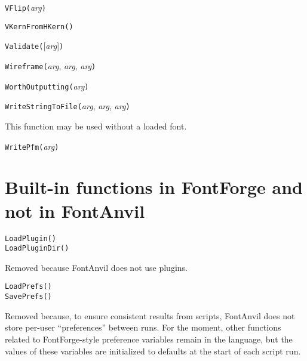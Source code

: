\texttt{VFlip(}\textit{arg}\texttt{)}



\texttt{VKernFromHKern(}\texttt{)}



\texttt{Validate(}[\textit{arg}]\texttt{)}



\texttt{Wireframe(}\textit{arg}, \textit{arg}, \textit{arg}\texttt{)}



\texttt{WorthOutputting(}\textit{arg}\texttt{)}



\texttt{WriteStringToFile(}\textit{arg}, \textit{arg}, \textit{arg}\texttt{)}

This function may be used without a loaded font.



\texttt{WritePfm(}\textit{arg}\texttt{)}


\section{Built-in functions in FontForge and not in FontAnvil}

\texttt{LoadPlugin()}\FFdiff\\
\texttt{LoadPluginDir()}

Removed because FontAnvil does not use plugins.

\noindent
\texttt{LoadPrefs()}\FFdiff\\
\texttt{SavePrefs()}

Removed because, to ensure consistent results from scripts, FontAnvil does
not store per-user ``preferences'' between runs.  For the moment, other
functions related to FontForge-style preference variables remain in the
language, but the values of these variables are initialized to defaults at
the start of each script run.

